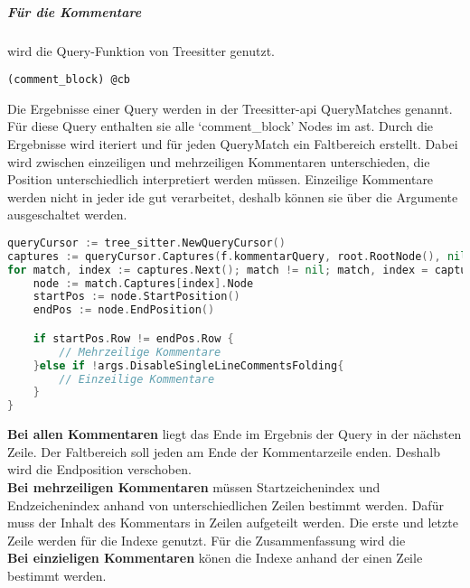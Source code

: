 \documentclass[./einleitung.tex]{subfiles}
\begin{document}
    \subparagraph{Für die Kommentare} wird die Query-Funktion von Treesitter genutzt.
    \begin{lstlisting}[capture=Die Query für alle Kommentare, label=lst:commentQuery]
(comment_block) @cb
    \end{lstlisting}
    Die Ergebnisse einer Query werden in der Treesitter-\acrshort{api} QueryMatches genannt.
    Für diese Query enthalten sie alle `comment_block' Nodes im \acrshort{ast}.
    Durch die Ergebnisse wird iteriert und für jeden QueryMatch ein Faltbereich erstellt.
    Dabei wird zwischen einzeiligen und mehrzeiligen Kommentaren unterschieden, die Position unterschiedlich interpretiert werden müssen.
    Einzeilige Kommentare werden nicht in jeder \acrshort{ide} gut verarbeitet, deshalb können sie über die Argumente ausgeschaltet werden.
    \begin{lstlisting}[language=Go, caption=Auszug aus der Bestimmung der Faltbereiche für die Kommentare, label=lst:foldingCommentsFor]
queryCursor := tree_sitter.NewQueryCursor()
captures := queryCursor.Captures(f.kommentarQuery, root.RootNode(), nil)
for match, index := captures.Next(); match != nil; match, index = captures.Next() {
    node := match.Captures[index].Node
    startPos := node.StartPosition()
    endPos := node.EndPosition()

    if startPos.Row != endPos.Row {
        // Mehrzeilige Kommentare
    }else if !args.DisableSingleLineCommentsFolding{
        // Einzeilige Kommentare
    }
}
    \end{lstlisting}
    \textbf{Bei allen Kommentaren} liegt das Ende im Ergebnis der Query in der nächsten Zeile.
    Der Faltbereich soll jeden am Ende der Kommentarzeile enden.
    Deshalb wird die Endposition verschoben.\\
    \textbf{Bei mehrzeiligen Kommentaren} müssen Startzeichenindex und Endzeichenindex anhand von unterschiedlichen Zeilen bestimmt werden.
    Dafür muss der Inhalt des Kommentars in Zeilen aufgeteilt werden.
    Die erste und letzte Zeile werden für die Indexe genutzt.
    Für die Zusammenfassung wird die \\
    \textbf{Bei einzieligen Kommentaren} könen die Indexe anhand der einen Zeile bestimmt werden.
\end{document}
